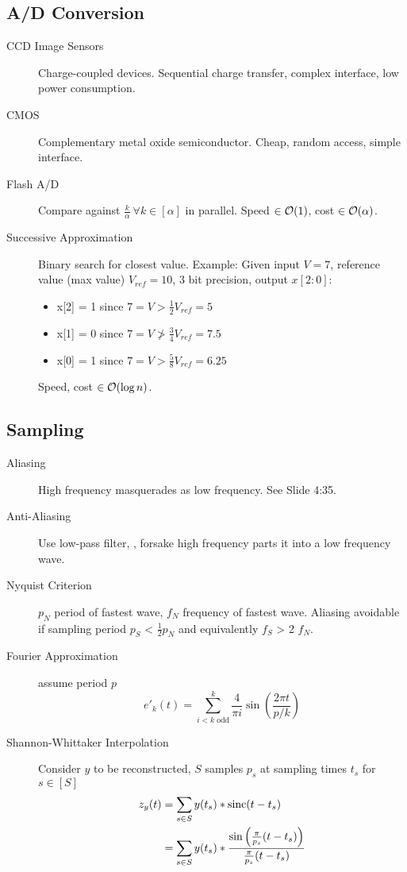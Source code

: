 
\subsection{A/D Conversion}
\begin{description}
	\item[CCD Image Sensors] Charge-coupled devices. Sequential charge transfer,
	complex interface, low power consumption.
	\item[CMOS] Complementary metal oxide semiconductor. Cheap, random access,
	simple interface.
	\item[Flash A/D] Compare against $\frac{k}{\alpha} \ \forall k \in [\alpha]$
	in parallel. Speed $\in \operatorname{\mathcal{O}}(1)$, cost $\in \operatorname{\mathcal{O}}(\alpha)$.
	\item[Successive Approximation] Binary search for closest value. Example:
	Given input $V = 7$, reference value (max value) $V_{ref} = 10$, 3 bit
	precision,
	output $x[2:0]$:
	\begin{itemize}
		\item x[2] = 1 since $7 = V > \frac{1}{2} V_{ref} = 5$
		\item x[1] = 0 since $7 = V \ngtr \frac{3}{4} V_{ref} = 7.5$
		\item x[0] = 1 since $7 = V > \frac{5}{8} V_{ref} = 6.25$
	\end{itemize}
	Speed, cost $\in \operatorname{\mathcal{O}}(\log n)$.
\end{description}

\subsection{Sampling}

\begin{description}
	\item[Aliasing] High frequency masquerades as low frequency. See Slide 4:35.
	\item[Anti-Aliasing] Use low-pass filter, \ie, forsake high frequency parts
	 it into a low frequency wave.
	\item[Nyquist Criterion] $p_N$ period of fastest wave, $f_N$ frequency of
	fastest wave. Aliasing avoidable if sampling period $p_S$ < $\frac{1}{2} p_N$
	and equivalently $f_S$ > 2 $f_N$.
	\item[Fourier Approximation] assume period $p$
	\[ 
	e'_k(t) = \sum^{k}_{i < k \text{ odd}}\frac{4}{\pi i} \sin\left(\frac{2\pi t}
	{p/k}\right)
	\]
	\item[Shannon-Whittaker Interpolation] Consider $y$ to be reconstructed, $S$
	samples $p_s$ at sampling times $t_s$ for $s \in [S]$
	\begin{align*}
	z_y(t) 	&= \sum_{s \in S} y(t_s) * \operatorname{sinc}(t - t_s)\\
	 		&= \sum_{s \in S} y(t_s) * \frac{\sin\left(\frac{\pi}{p_s}(t-t_s)\right)}
	 		{\frac{\pi}{p_s}(t-t_s)}
	\end{align*}
\end{description}

